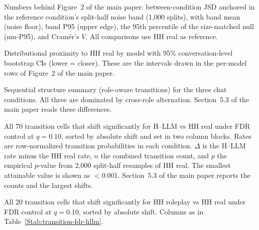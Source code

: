 \documentclass[fleqn,10pt]{JLA_article}
\newcommand{\fitwidth}[1]{\resizebox{\ifdim\width>\linewidth \linewidth\else \width\fi}{!}{#1}}
\begin{document}
\begin{table}[t]
\caption{Numbers behind Figure~2 of the main paper: between-condition JSD anchored in the reference condition's split-half noise band (1{,}000 splits), with band mean (noise floor), band P95 (upper edge), the 95th percentile of the size-matched null (nm-P95), and Cram\'er's $V$. All comparisons use HH real as reference.}
\label{Stab:noise-band-chat}
\centering
\footnotesize
\setlength{\tabcolsep}{4pt}
\fitwidth{}
\end{table}

\begin{table}[t]
\caption{Distributional proximity to HH real by model with 95\% conversation-level bootstrap CIs (lower = closer). These are the intervals drawn in the per-model rows of Figure~2 of the main paper.}
\label{Stab:model-realness}
\centering
\footnotesize
\setlength{\tabcolsep}{3pt}
\fitwidth{}
\end{table}

\begin{table}[t]
\caption{Sequential structure summary (role-aware transitions) for the three chat conditions. All three are dominated by cross-role alternation. Section~5.3 of the main paper reads these differences.}
\label{Stab:transition-summary}
\centering
\footnotesize
\setlength{\tabcolsep}{3pt}
\fitwidth{}
\end{table}

\begin{table}[t]
\caption{All 70 transition cells that shift significantly for H--LLM vs HH real under FDR control at $q=0.10$, sorted by absolute shift and set in two column blocks. Rates are row-normalized transition probabilities in each condition. $\Delta$ is the H--LLM rate minus the HH real rate, $n$ the combined transition count, and $p$ the empirical $p$-value from 2{,}000 split-half resamples of HH real. The smallest attainable value is shown as $<$0.001. Section~5.3 of the main paper reports the counts and the largest shifts.}
\label{Stab:transition-fdr-hllm}
\centering
\footnotesize
\setlength{\tabcolsep}{3pt}
\fitwidth{}
\end{table}

\begin{table}[t]
\caption{All 20 transition cells that shift significantly for HH roleplay vs HH real under FDR control at $q=0.10$, sorted by absolute shift. Columns as in Table~\ref{Stab:transition-fdr-hllm}.}
\label{Stab:transition-fdr-roleplay}
\centering
\footnotesize
\setlength{\tabcolsep}{3pt}
\fitwidth{}
\end{table}
\end{document}

